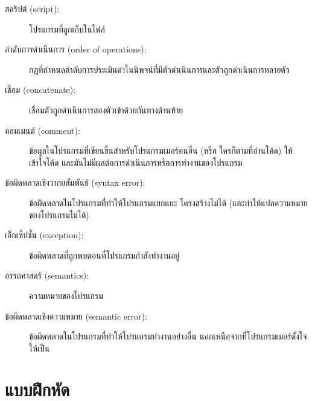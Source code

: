 \begin{description}
\item[สคริปต์ (script):] โปรแกรมที่ถูกเก็บในไฟล์

\item[ลำดับการดำเนินการ (order of operations):] กฎที่กำหนดลำดับการประเมินค่าในนิพจน์ที่มีตัวดำเนินการและตัวถูกดำเนินการหลายตัว  

\item[เชื่อม (concatenate):]  เชื่อมตัวถูกดำเนินการสองตัวเข้าด้วยกันทางด้านท้าย

\item[คอมเมนต์ (comment):]  ข้อมูลในโปรแกรมที่เขียนขึ้นสำหรับโปรแกรมเมอร์คนอื่น (หรือ
ใครก็ตามที่อ่านโค้ด) ให้เข้าใจโค้ด และมันไม่มีผลต่อการดำเนินการหรือการทำงานของโปรแกรม 

\item[ข้อผิดพลาดเชิงวากยสัมพันธ์ (syntax error):]  ข้อผิดพลาดในโปรแกรมที่ทำให้โปรแกรมแยกแยะ
โครงสร้างไม่ได้ (และทำให้แปลความหมายของโปรแกรมไม่ได้) 

\item[เอ็กเซ็ปชั่น (exception):]  ข้อผิดพลาดที่ถูกพบตอนที่โปรแกรมกำลังทำงานอยู่

\item[อรรถศาสตร์ (semantics):]  ความหมายของโปรแกรม

\item[ข้อผิดพลาดเชิงความหมาย (semantic error):]   ข้อผิดพลาดในโปรแกรมที่ทำให้โปรแกรมทำงานอย่างอื่น นอกเหนือจากที่โปรแกรมเมอร์ตั้งใจให้เป็น 

\end{description}


\section{แบบฝึกหัด}

